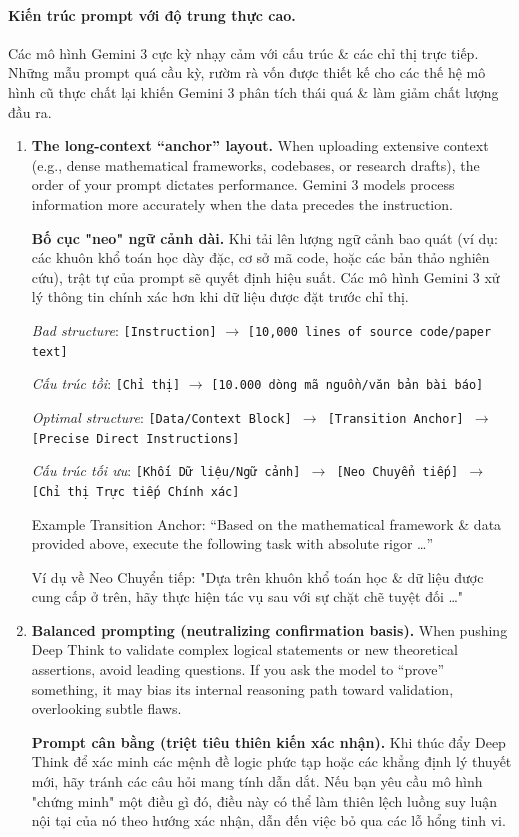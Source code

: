 \documentclass{article}
\begin{document}
\paragraph{Kiến trúc prompt với độ trung thực cao.} Các mô hình Gemini 3 cực kỳ nhạy cảm với cấu trúc \& các chỉ thị trực tiếp. Những mẫu prompt quá cầu kỳ, rườm rà vốn được thiết kế cho các thế hệ mô hình cũ thực chất lại khiến Gemini 3 phân tích thái quá \& làm giảm chất lượng đầu ra.
\begin{enumerate}
	\item \textbf{The long-context ``anchor'' layout.} When uploading extensive context (e.g., dense mathematical frameworks, codebases, or research drafts), the order of your prompt dictates performance. Gemini 3 models process information more accurately when the data precedes the instruction.
	
	\textbf{Bố cục "neo" ngữ cảnh dài.} Khi tải lên lượng ngữ cảnh bao quát (ví dụ: các khuôn khổ toán học dày đặc, cơ sở mã code, hoặc các bản thảo nghiên cứu), trật tự của prompt sẽ quyết định hiệu suất. Các mô hình Gemini 3 xử lý thông tin chính xác hơn khi dữ liệu được đặt trước chỉ thị.
	
	\textit{Bad structure}: {\tt[Instruction]} $\to$ {\tt[10,000 lines of source code/paper text]}
	
	\textit{Cấu trúc tồi}: {\tt[Chỉ thị]} $\to$ {\tt[10.000 dòng mã nguồn/văn bản bài báo]}
	
	\textit{Optimal structure}: {\tt[Data/Context Block] $\to$ [Transition Anchor] $\to$ [Precise Direct Instructions]}
	
	\textit{Cấu trúc tối ưu}: {\tt[Khối Dữ liệu/Ngữ cảnh] $\to$ [Neo Chuyển tiếp] $\to$ [Chỉ thị Trực tiếp Chính xác]}
	
	Example Transition Anchor: ``Based on the mathematical framework \& data provided above, execute the following task with absolute rigor \ldots''
	
	Ví dụ về Neo Chuyển tiếp: "Dựa trên khuôn khổ toán học \& dữ liệu được cung cấp ở trên, hãy thực hiện tác vụ sau với sự chặt chẽ tuyệt đối \ldots"
	\item \textbf{Balanced prompting (neutralizing confirmation basis).} When pushing Deep Think to validate complex logical statements or new theoretical assertions, avoid leading questions. If you ask the model to ``prove'' something, it may bias its internal reasoning path toward validation, overlooking subtle flaws.
	
	\textbf{Prompt cân bằng (triệt tiêu thiên kiến xác nhận).} Khi thúc đẩy Deep Think để xác minh các mệnh đề logic phức tạp hoặc các khẳng định lý thuyết mới, hãy tránh các câu hỏi mang tính dẫn dắt. Nếu bạn yêu cầu mô hình "chứng minh" một điều gì đó, điều này có thể làm thiên lệch luồng suy luận nội tại của nó theo hướng xác nhận, dẫn đến việc bỏ qua các lỗ hổng tinh vi.
	

\end{enumerate}
\end{document}

